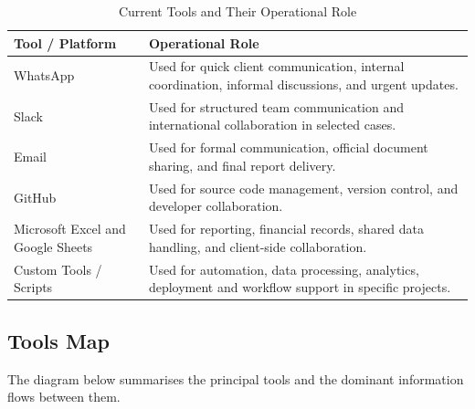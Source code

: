 \documentclass[12pt,a4paper]{report}
\begin{document}
\begin{table}[H]
\centering
\renewcommand{\arraystretch}{1.3}
\begin{tabularx}{\textwidth}{|p{4cm}|X|}
\hline
\rowcolor{secondary}
\textbf{Tool / Platform} & \textbf{Operational Role} \\
\hline
WhatsApp & Used for quick client communication, internal coordination, informal discussions, and urgent updates. \\
\hline
Slack & Used for structured team communication and international collaboration in selected cases. \\
\hline
Email & Used for formal communication, official document sharing, and final report delivery. \\
\hline
GitHub & Used for source code management, version control, and developer collaboration. \\
\hline
Microsoft Excel and Google Sheets & Used for reporting, financial records, shared data handling, and client-side collaboration. \\
\hline
Custom Tools / Scripts & Used for automation, data processing, analytics, deployment and workflow support in specific projects. \\
\hline
\end{tabularx}
\caption{Current Tools and Their Operational Role}
\end{table}

\subsection{Tools Map}
The diagram below summarises the principal tools and the dominant information flows between them.
\end{document}
